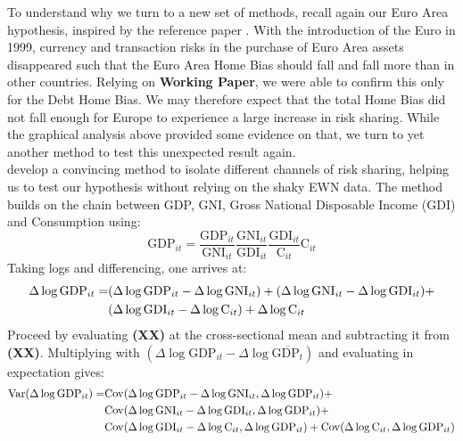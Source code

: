 \documentclass[12pt,a4paper]{article}
\begin{document}
\noindent To understand why we turn to a new set of methods, recall again our Euro Area hypothesis, inspired by the reference paper \textcite{main}.
With the introduction of the Euro in 1999, currency and transaction risks in the purchase of Euro Area assets disappeared such that the Euro Area Home Bias
should fall and fall more than in other countries. Relying on \textbf{Working Paper}, we were able to confirm this only for the Debt Home Bias.
We may therefore expect that the total Home Bias did not fall enough for Europe to experience a large increase in risk sharing. While the graphical analysis above
provided some evidence on that, we turn to yet another method to test this unexpected result again.\\
\indent \textcite{asy1996} develop a convincing method to isolate different channels of risk sharing, helping us to test our hypothesis without relying on the shaky EWN data. The method builds on the chain 
between GDP, GNI, Gross National Disposable Income (GDI) and Consumption using:
\begin{equation}
    \mathrm{GDP}_{it} = \frac{\mathrm{GDP}_{it}}{\mathrm{GNI}_{it}}\frac{\mathrm{GNI}_{it}}{\mathrm{GDI}_{it}}\frac{\mathrm{GDI}_{it}}{\mathrm{C}_{it}}\mathrm{C}_{it}
\end{equation}
Taking logs and differencing, one arrives at:
\begin{align}
    \Delta \log \mathrm{GDP}_{it} = & (\Delta \log \mathrm{GDP}_{it} - \Delta \log \mathrm{GNI}_{it}) + (\Delta \log \mathrm{GNI}_{it} - \Delta \log \mathrm{GDI}_{it}) + \\
    & (\Delta \log \mathrm{GDI}_{it} - \Delta \log \mathrm{C}_{it}) + \Delta \log \mathrm{C}_{it} \notag
\end{align}
Proceed by evaluating \textbf{(XX)} at the cross-sectional mean and subtracting it from \textbf{(XX)}. Multiplying with $(\Delta \log \mathrm{GDP}_{it} - \Delta \log \overline{\mathrm{GDP}_{t}})$ 
and evaluating in expectation gives:
\begin{align}
    \mathrm{Var}(\Delta \log \mathrm{GDP}_{it}) = & \mathrm{Cov}(\Delta \log \mathrm{GDP}_{it} - \Delta \log \mathrm{GNI}_{it}, \Delta \log \mathrm{GDP}_{it}) + \\
    & \mathrm{Cov}(\Delta \log \mathrm{GNI}_{it} - \Delta \log \mathrm{GDI}_{it}, \Delta \log \mathrm{GDP}_{it}) + \notag \\
    & \mathrm{Cov}(\Delta \log \mathrm{GDI}_{it} - \Delta \log \mathrm{C}_{it}, \Delta \log \mathrm{GDP}_{it}) + \mathrm{Cov}(\Delta \log \mathrm{C}_{it}, \Delta \log \mathrm{GDP}_{it}) \notag
\end{align}
\end{document}
